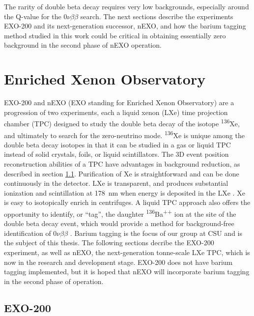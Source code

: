 
The rarity of double beta decay requires very low backgrounds, especially around the Q-value for the $0\nu\beta\beta$ search. The next sections describe the experiments EXO-200 and its next-generation successor, nEXO, and how the barium tagging method studied in this work could be critical in obtaining essentially zero background in the second phase of nEXO operation.

\section{Enriched Xenon Observatory}

EXO-200 and nEXO (EXO standing for Enriched Xenon Observatory) are a progression of two experiments, each a liquid xenon (LXe) time projection chamber (TPC) designed to study the double beta decay of the isotope \textsuperscript{136}Xe, and ultimately to search for the zero-neutrino mode.  \textsuperscript{136}Xe is unique among the double beta decay isotopes in that it can be studied in a gas or liquid TPC instead of solid crystals, foils, or liquid scintillators.  The 3D event position reconstruction abilities of a TPC have advantages in background reduction, as described in section \ref{subsec:EXO200}.  Purification of Xe is straightforward and can be done continuously in the detector.  LXe is transparent, and produces substantial ionization and scintillation at 178~nm when energy is deposited in the LXe \cite{EXO200TwoNuLong}.  Xe is easy to isotopically enrich in centrifuges.  A liquid TPC approach also offers the opportunity to identify, or ``tag'', the daughter \textsuperscript{136}Ba\textsuperscript{++} ion at the site of the double beta decay event, which would provide a method for background-free identification of $0\nu\beta\beta$ \cite{Moe1991}. Barium tagging is the focus of our group at CSU and is the subject of this thesis.  The following sections decribe the EXO-200 experiment, as well as nEXO, the next-generation tonne-scale LXe TPC, which is now in the research and development stage.  EXO-200 does not have barium tagging implemented, but it is hoped that nEXO will incorporate barium tagging in the second phase of operation. 

\subsection{EXO-200}
\label{subsec:EXO200}


